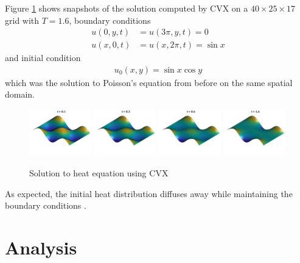 \documentclass[conference]{IEEEtran}
\begin{document}
Figure \ref{fig:heat-solution} shows snapshots of the solution computed by CVX on a $40 \times 25 \times 17$ grid with $T = 1.6$, boundary conditions
\begin{align}
  u(0, y, t) &= u(3\pi, y, t) = 0 \\
  u(x, 0, t) &= u(x, 2\pi, t) = \sin x
\end{align}
and initial condition
\begin{align}
  u_0(x, y) = \sin x \cos y
\end{align}
which was the solution to Poisson's equation from before on the same spatial domain.
\begin{figure}[b]
  \begin{center}
    \includegraphics[width=0.24\textwidth,trim={1cm 1cm 0 0},clip]{heat-solution-1}
    \includegraphics[width=0.24\textwidth,trim={1cm 1cm 0 0},clip]{heat-solution-3}
    \includegraphics[width=0.24\textwidth,trim={1cm 1cm 0 0},clip]{heat-solution-6}
    \includegraphics[width=0.24\textwidth,trim={1cm 1cm 0 0},clip]{heat-solution-16}
    \caption{Solution to heat equation using CVX}
    \label{fig:heat-solution}
  \end{center}
\end{figure}
As expected, the initial heat distribution diffuses away while maintaining the boundary conditions .


\section{Analysis}
\end{document}
